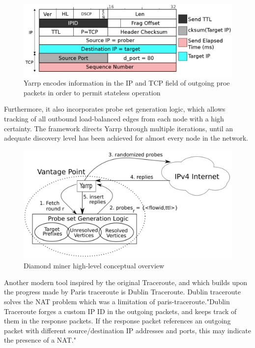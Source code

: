 \begin{figure}[!ht]
  \begin{center}
    \includegraphics[scale=0.3]{images/yarrp.png}
    \caption{Yarrp encodes information in the IP and TCP field of outgoing proe packets in order to permit stateless operation \cite{yarrp}}
    \label{figure:yarrp_fig}
  \end{center}
\end{figure}

Furthermore, it also incorporates probe set generation logic, which allows tracking of all outbound load-balanced edges from each node with a high certainty. The framework directs Yarrp through multiple iterations, until an adequate discovery level has been achieved for almost every node in the network. \cite{diamond-miner}

\begin{figure}[!ht]
  \begin{center}
    \includegraphics[scale=0.3]{images/diamond.png}
    \caption{Diamond miner high-level conceptual overview \cite{diamond-miner}}
    \label{figure:dminer_overview_fig}
  \end{center}
\end{figure}

Another modern tool inspired by the original Traceroute, and which builds upon the progress made by Paris traceroute is Dublin Traceroute. Dublin traceroute solves the NAT problem which was a limitation of paris-traceroute."Dublin Traceroute forges a custom IP ID in the outgoing packets, and keeps track of them in the response packets. If the response packet references an outgoing packet with different source/destination IP addresses and ports, this may indicate the presence of a NAT." \cite{dublin} \cite{dublin_website} 

